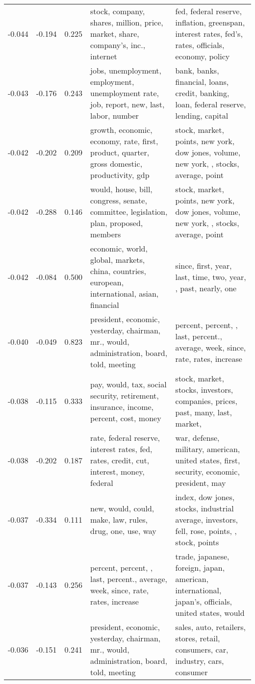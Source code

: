 \begin{tabular}{cccp{5cm}p{5cm}}
-0.044 & -0.194 & 0.225 & stock, company, shares, million, price, market, share, company's, inc., internet & fed, federal reserve, inflation, greenspan, interest rates, fed's, rates, officials, economy, policy \\
-0.043 & -0.176 & 0.243 & jobs, unemployment, employment, unemployment rate, job, report, new, last, labor, number & bank, banks, financial, loans, credit, banking, loan, federal reserve, lending, capital \\
-0.042 & -0.202 & 0.209 & growth, economic, economy, rate, first, product, quarter, gross domestic, productivity, gdp & stock, market, points, new york, dow jones, volume, new york, , stocks, average, point \\
-0.042 & -0.288 & 0.146 & would, house, bill, congress, senate, committee, legislation, plan, proposed, members & stock, market, points, new york, dow jones, volume, new york, , stocks, average, point \\
-0.042 & -0.084 & 0.500 & economic, world, global, markets, china, countries, european, international, asian, financial & since, first, year, last, time, two, year, , past, nearly, one \\
-0.040 & -0.049 & 0.823 & president, economic, yesterday, chairman, mr., would, administration, board, told, meeting & percent, percent, , last, percent., average, week, since, rate, rates, increase \\
-0.038 & -0.115 & 0.333 & pay, would, tax, social security, retirement, insurance, income, percent, cost, money & stock, market, stocks, investors, companies, prices, past, many, last, market,  \\
-0.038 & -0.202 & 0.187 & rate, federal reserve, interest rates, fed, rates, credit, cut, interest, money, federal & war, defense, military, american, united states, first, security, economic, president, may \\
-0.037 & -0.334 & 0.111 & new, would, could, make, law, rules, drug, one, use, way & index, dow jones, stocks, industrial average, investors, fell, rose, points, , stock, points \\
-0.037 & -0.143 & 0.256 & percent, percent, , last, percent., average, week, since, rate, rates, increase & trade, japanese, foreign, japan, american, international, japan's, officials, united states, would \\
-0.036 & -0.151 & 0.241 & president, economic, yesterday, chairman, mr., would, administration, board, told, meeting & sales, auto, retailers, stores, retail, consumers, car, industry, cars, consumer \\

\end{tabular}
